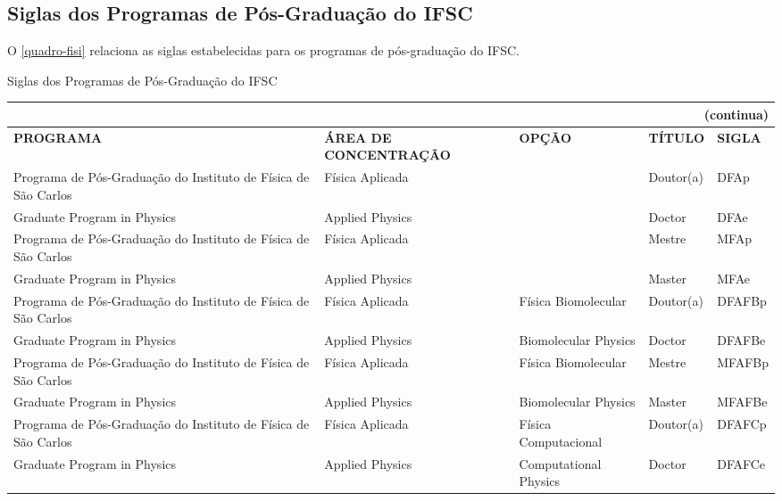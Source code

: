 \begin{apendicesenv}
\chapter{Siglas dos Programas de Pós-Graduação do IFSC}
O \autoref{quadro-fisi} relaciona as siglas estabelecidas para os programas de pós-graduação do IFSC.
\begin{quadro}[htb] 
	\ABNTEXfontereduzida
	\caption[Siglas dos Programas de Pós-Graduação do IFSC]{Siglas dos Programas de Pós-Graduação do IFSC}
	\label{quadro-fisi}
	\begin{tabular}{|p{3.5cm}|p{3.5cm}|p{3.5cm}|p{1.5cm}|p{2.25cm}|}
	\multicolumn{5}{r}{{(continua)}} \\ 
    \hline
		\textbf{PROGRAMA} & \textbf{ÁREA DE CONCENTRAÇÃO} & \textbf{OPÇÃO} & \textbf{TÍTULO} & \textbf{SIGLA}  \\
		\hline
		Programa de Pós-Graduação do Instituto de Física de São Carlos & Física Aplicada &  & Doutor(a) & DFAp\\
		Graduate Program in Physics & Applied Physics &  & Doctor & DFAe\\
		Programa de Pós-Graduação do Instituto de Física de São Carlos & Física Aplicada &  & Mestre & MFAp\\
		Graduate Program in Physics & Applied Physics &  & Master & MFAe\\
		Programa de Pós-Graduação do Instituto de Física de São Carlos & Física Aplicada & Física Biomolecular & Doutor(a) & DFAFBp\\
		Graduate Program in Physics & Applied Physics & Biomolecular Physics & Doctor & DFAFBe\\
		Programa de Pós-Graduação do Instituto de Física de São Carlos & Física Aplicada & Física Biomolecular & Mestre & MFAFBp\\
		Graduate Program in Physics & Applied Physics & Biomolecular Physics & Master & MFAFBe\\
		Programa de Pós-Graduação do Instituto de Física de São Carlos & Física Aplicada & Física Computacional & Doutor(a) & DFAFCp\\
		Graduate Program in Physics & Applied Physics & Computational Physics & Doctor & DFAFCe\\		

	\end{tabular}
\end{quadro}


\end{apendicesenv}
